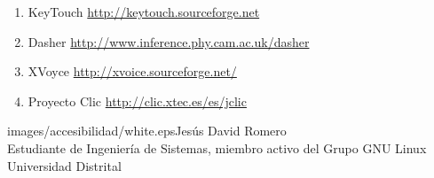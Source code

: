 \begin{multicols}{2}
\begin{enumerate}
\item KeyTouch \url{http://keytouch.sourceforge.net}

\item Dasher \url{http://www.inference.phy.cam.ac.uk/dasher}

\item XVoyce \url{http://xvoice.sourceforge.net/}

\item Proyecto Clic \url{http://clic.xtec.es/es/jclic}




\end{enumerate}

\begin{biografia}{images/accesibilidad/white.eps}{Jesús David Romero} 
\\
Estudiante de Ingeniería de Sistemas, miembro activo del Grupo GNU Linux Universidad Distrital
\end{biografia}

\raggedcolumns
\pagebreak


\end{multicols}

\clearpage
\pagebreak
